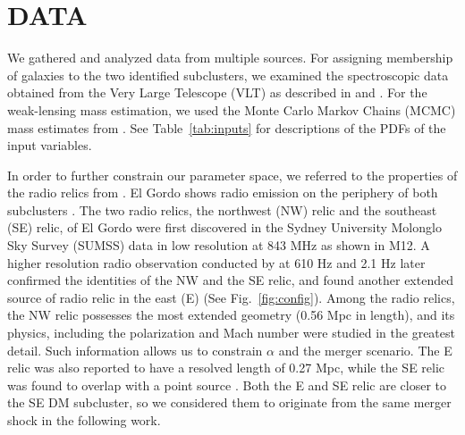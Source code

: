 \section{DATA} 
We gathered and analyzed data from multiple sources. For assigning membership of galaxies to the two identified subclusters, we
examined the spectroscopic data obtained from the Very Large Telescope
(VLT) as described in  and \citet{Sifon13}.
For the weak-lensing mass estimation, we used the
Monte Carlo Markov Chains (MCMC) mass estimates from .
See Table~\ref{tab:inputs} for descriptions of the PDFs of the input
variables. \par 
In order to further constrain our parameter space, we referred to the properties of
the radio relics from \citet{L13}. El Gordo shows radio emission on the
periphery of both subclusters . The two radio relics, the
northwest (NW) relic and the southeast (SE) relic, of El Gordo were first
discovered in the Sydney University Molonglo Sky Survey (SUMSS) data in low
resolution at 843 MHz \citep{Mauch03} as shown in M12. A higher
resolution radio observation conducted by \cite{L13} at 610 \mega Hz and
2.1 \giga Hz later confirmed the identities of the NW and the SE relic, and
found another extended source of radio relic in the east (E) (See Fig.~\ref{fig:config}). Among the radio relics, the NW relic possesses the most extended geometry
(0.56 Mpc in length), and its physics, including the
polarization and Mach number were studied in the greatest detail. Such
information allows us to constrain $\alpha$ and the merger scenario. The E relic
was also reported to have a resolved length of 0.27 Mpc, while the SE relic
was found to overlap with a point source \citep{L13}. Both the E and SE
relic are closer to the SE DM subcluster, so we considered them to
originate from the same merger shock in the following work.

